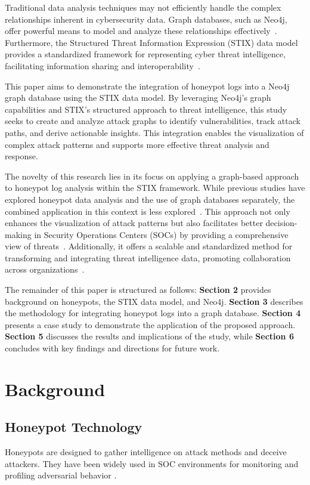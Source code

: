 \documentclass[conference]{IEEEtran}
\begin{document}
Traditional data analysis techniques may not efficiently handle the complex relationships inherent in cybersecurity data. Graph databases, such as Neo4j, offer powerful means to model and analyze these relationships effectively~\cite{robinson2015graph}. Furthermore, the Structured Threat Information Expression (STIX) data model provides a standardized framework for representing cyber threat intelligence, facilitating information sharing and interoperability~\cite{oasis2023stix}.

This paper aims to demonstrate the integration of honeypot logs into a Neo4j graph database using the STIX data model. By leveraging Neo4j's graph capabilities and STIX's structured approach to threat intelligence, this study seeks to create and analyze attack graphs to identify vulnerabilities, track attack paths, and derive actionable insights. This integration enables the visualization of complex attack patterns and supports more effective threat analysis and response.

The novelty of this research lies in its focus on applying a graph-based approach to honeypot log analysis within the STIX framework. While previous studies have explored honeypot data analysis and the use of graph databases separately, the combined application in this context is less explored~\cite{sharma2018utilizing}. This approach not only enhances the visualization of attack patterns but also facilitates better decision-making in Security Operations Centers (SOCs) by providing a comprehensive view of threats~\cite{ring2019survey}. Additionally, it offers a scalable and standardized method for transforming and integrating threat intelligence data, promoting collaboration across organizations~\cite{barnum2012standardizing}.

The remainder of this paper is structured as follows: \textbf{Section 2} provides background on honeypots, the STIX data model, and Neo4j. \textbf{Section 3} describes the methodology for integrating honeypot logs into a graph database. \textbf{Section 4} presents a case study to demonstrate the application of the proposed approach. \textbf{Section 5} discusses the results and implications of the study, while \textbf{Section 6} concludes with key findings and directions for future work.




\section{Background}
\subsection{Honeypot Technology}
Honeypots are designed to gather intelligence on attack methods and deceive attackers. They have been widely used in SOC environments for monitoring and profiling adversarial behavior \cite{honeypotsurvey}.
\end{document}
